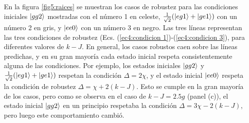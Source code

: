 En la figura \ref{fig5:raices} se muestran los casos de robustez para las condiciones iniciales $\ket{gg2}$ mostradas con el número 1 en celeste, $\frac{1}{\sqrt{2}}(\ket{eg1}+\ket{ge1})$ con un número 2 en gris, y $\ket{ee0}$ con un número 3 en negro. Las tres líneas representan las tres condiciones de robustez (Ecs. (\ref{ec4:condicion 1})-(\ref{ec4:condicion 3}), para diferentes valores de $k-J$. En general, los casos robustos caen sobre las líneas predichas, y en su gran mayoría cada estado inicial respeta consistentemente alguna de las condiciones. Por ejemplo, los estados iniciales $\ket{gg2}$ y $\frac{1}{\sqrt{2}}(\ket{eg1}+\ket{ge1})$ respetan la condición $\Delta=2\chi$, y el estado inicial $\ket{ee0}$ respeta la condición de robustez $\Delta=\chi+2(k-J)$. Esto se cumple en la gran mayoría de los casos, pero como se observa en el caso de $k-J=2.5g$ (panel (c)), el estado inicial $\ket{gg2}$ en un principio respetaba la condición $\Delta=3\chi-2(k-J)$, pero luego este comportamiento cambió. 

